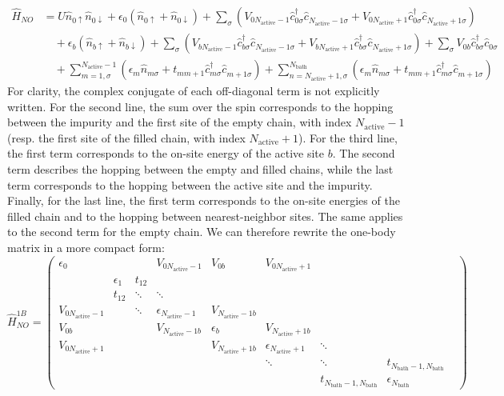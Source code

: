 \documentclass[11pt]{article}
\newcommand{\hamiltonian}{\hat{H}}
\newcommand{\creation}[1]{\hat{c}_{{#1}}^{\dagger}}
\newcommand{\annihilation}[1]{\hat{c}_{{#1}}^{\phantom{\dagger}}}
\newcommand{\occupation}[1]{\hat{n}_{{#1}}}
\newcommand{\bath}{\text{bath}}
\newcommand{\activ}{\text{active}}
\begin{document}
\begin{align*}
\hamiltonian_{NO} & = U \occupation{0\uparrow}\occupation{0\downarrow} + \epsilon_0 (\occupation{0\uparrow} + \occupation{0\downarrow}) + \sum_\sigma \left(V_{0N_\activ-1}\creation{0\sigma}\annihilation{N_\activ-1\sigma} + V_{0N_\activ+1}\creation{0\sigma}\annihilation{N_\activ+1\sigma}\right)\\
& \quad + \epsilon_b (\occupation{b\uparrow} + \occupation{b\downarrow}) + \sum_\sigma \left(V_{bN_\activ-1}\creation{b\sigma}\annihilation{N_\activ-1\sigma} + V_{bN_\activ+1}\creation{b\sigma}\annihilation{N_\activ+1\sigma}\right) + \sum_\sigma V_{0b}\creation{b\sigma}\annihilation{0\sigma}\\
& \quad + \!\!\!\!\!
\sum_{m=1,\sigma}^{N_\activ-1}\left( \epsilon_m \occupation{m\sigma} + t_{mm+1} \creation{m\sigma}\annihilation{m+1\sigma}\right) + \!\!\!\!\!\!\!\!\!\!\sum_{n=N_\activ+1,\sigma}^{N_\bath}
\!\!\!\!\!\!\!\!\!\!
\left( \epsilon_m \occupation{m\sigma} + t_{mm+1} \creation{m\sigma}\annihilation{m+1\sigma}\right)
\end{align*}
For clarity, the complex conjugate of each off-diagonal term is not explicitly written. For the second line, the sum over the spin corresponds to the hopping between the impurity and the first site of the empty chain, with index $N_\activ-1$ (resp. the first site of the filled chain, with index $N_\activ+1$). For the third line, the first term corresponds to the on-site energy of the active site $b$. The second term describes the hopping between the empty and filled chains, while the last term corresponds to the hopping between the active site and the impurity. Finally, for the last line, the first term corresponds to the on-site energies of the filled chain and to the hopping between nearest-neighbor sites. The same applies to the second term for the empty chain. We can therefore rewrite the one-body matrix in a more compact form:
\begin{equation}\label{eq:h_no_matrix}
\hamiltonian_{NO}^{1B} =
\begin{pmatrix}
 \epsilon_0 & & & V_{0N_\activ-1} & V_{0b} & V_{0N_\activ+1} & &\\
  & \epsilon_1 & t_{12} & & & & &\\
  & t_{12} & \ddots & \ddots & & & &\\
 V_{0N_\activ-1} & & \ddots & \epsilon_{N_\activ-1}  & V_{N_\activ-1b} & & &\\
  V_{0b}& & &V_{N_\activ-1b} & \epsilon_{b} & V_{N_\activ+1b}& &\\
 V_{0N_\activ+1} & & & & V_{N_\activ+1b}& \epsilon_{N_\activ+1}& \ddots & &\\
  & & & & & \ddots & \ddots &t_{N_\bath-1,N_\bath}\\
  & & & & & & t_{N_\bath-1,N_\bath} &\epsilon_{N_\bath}
\end{pmatrix}
\end{equation}
\end{document}
